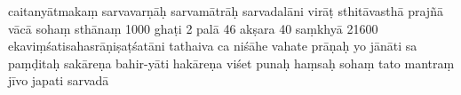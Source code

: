 \begin{ekdosis}
\begin{prose}
{         caitanyātmakaṃ\dd{}
        sarvavarṇāḥ\dd{}
        sarvamātrāḥ\dd{}
        sarvadalāni\dd{}
        virāṭ 
        sthitāvasthā\dd{} 
        prajñā vācā\dd{}
        sohaṃ \dd{}
         sthānaṃ\dd{}
         \dd{} 1000 ghaṭi 2 palā 46 akṣara 40\dd{}
         saṃkhyā\dd{}
        21600\dd{}
        ekaviṃśatisahasrāṇiṣaṭśatāni\dd{}
        tathaiva ca niśāhe vahate\dd{}
        prāṇaḥ yo jānāti sa paṃḍitaḥ\dd{} %
        sakāreṇa bahir-yāti hakāreṇa viśet punaḥ\dd{}  
        haṃsaḥ sohaṃ\dd{}
        tato mantraṃ jīvo japati sarvadā\dd{}}

\end{prose}
\end{ekdosis}

